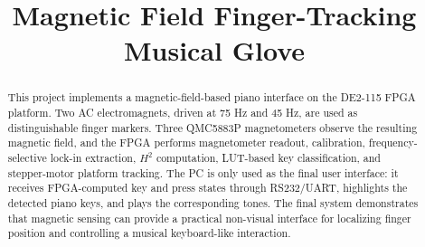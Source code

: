 \documentclass[a4paper,12pt]{article}
\title{Magnetic Field Finger-Tracking Musical Glove}
\begin{document}
\maketitle

\begin{abstract}
This project implements a magnetic-field-based piano interface on the DE2-115 FPGA platform. Two AC electromagnets, driven at 75 Hz and 45 Hz, are used as distinguishable finger markers. Three QMC5883P magnetometers observe the resulting magnetic field, and the FPGA performs magnetometer readout, calibration, frequency-selective lock-in extraction, $H^2$ computation, LUT-based key classification, and stepper-motor platform tracking. The PC is only used as the final user interface: it receives FPGA-computed key and press states through RS232/UART, highlights the detected piano keys, and plays the corresponding tones. The final system demonstrates that magnetic sensing can provide a practical non-visual interface for localizing finger position and controlling a musical keyboard-like interaction.
\end{abstract}

\tableofcontents
\newpage


\newpage


\newpage







\begin{appendices}

\end{appendices}



\end{document}
